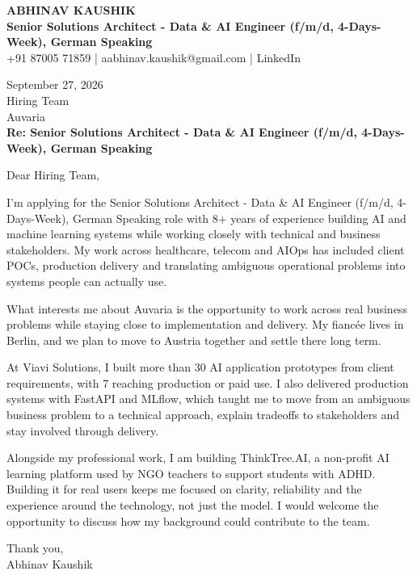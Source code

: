 \documentclass[10pt,a4paper]{article}
\begin{document}
\begin{center}
{\Large\bfseries ABHINAV KAUSHIK}\\[2pt]
{\bfseries Senior Solutions Architect - Data \& AI Engineer (f/m/d, 4-Days-Week), German Speaking}\\[2pt]
+91 87005 71859 \quad | \quad aabhinav.kaushik@gmail.com \quad | \quad LinkedIn
\end{center}
\vspace{8pt}
September 27, 2026\\[6pt]
Hiring Team\\
Auvaria\\[4pt]
\textbf{Re: Senior Solutions Architect - Data \& AI Engineer (f/m/d, 4-Days-Week), German Speaking}

Dear Hiring Team,

I’m applying for the Senior Solutions Architect - Data \& AI Engineer (f/m/d, 4-Days-Week), German Speaking role with 8+ years of experience building AI and machine learning systems while working closely with technical and business stakeholders. My work across healthcare, telecom and AIOps has included client POCs, production delivery and translating ambiguous operational problems into systems people can actually use.

What interests me about Auvaria is the opportunity to work across real business problems while staying close to implementation and delivery. My fiancée lives in Berlin, and we plan to move to Austria together and settle there long term.

At Viavi Solutions, I built more than 30 AI application prototypes from client requirements, with 7 reaching production or paid use. I also delivered production systems with FastAPI and MLflow, which taught me to move from an ambiguous business problem to a technical approach, explain tradeoffs to stakeholders and stay involved through delivery.

Alongside my professional work, I am building ThinkTree.AI, a non-profit AI learning platform used by NGO teachers to support students with ADHD. Building it for real users keeps me focused on clarity, reliability and the experience around the technology, not just the model. I would welcome the opportunity to discuss how my background could contribute to the team.

Thank you,\\
Abhinav Kaushik
\end{document}
